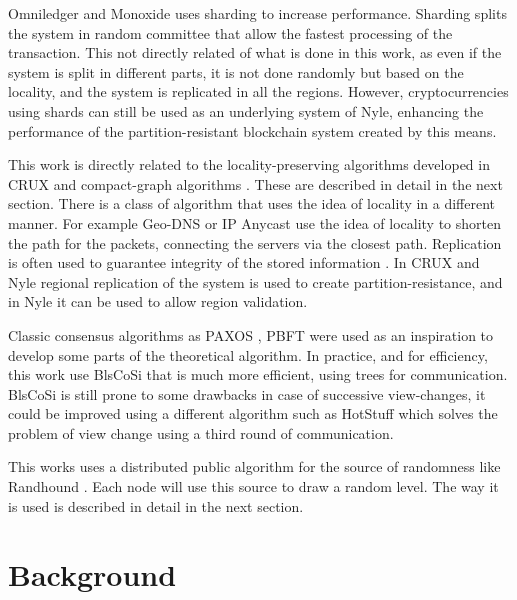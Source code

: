 \documentclass[a4paper,11pt,oneside]{report}
\begin{document}
Omniledger \cite{Kokoris-Kogias2017}  and Monoxide \cite{Wang2019} uses
sharding to increase performance.  Sharding splits the system in random
committee that allow the fastest processing of the transaction. This not
directly related of what is done in this work, as even if the system is split
in different parts, it is not done randomly but based on the locality, and the
system is replicated in all the regions. However, cryptocurrencies using shards
can still be used as an underlying system of Nyle, enhancing the performance of
the partition-resistant blockchain system created by this means.

This work is directly related to the locality-preserving algorithms developed
in CRUX \cite{Basescu2014} and compact-graph algorithms \cite{Thorup2005}. These
are described in detail in the next section. There is a class of algorithm that
uses the idea of locality in a different manner. For example Geo-DNS
\cite{Katz-bassett2006} or IP Anycast \cite{Abley2006} use the idea of locality
to shorten the path for the packets, connecting the servers via the closest
path. Replication is often used to guarantee integrity of the stored
information \cite{find-paper-replication}. In CRUX \cite{Basescu2014} and Nyle
regional replication of the system is used to create partition-resistance, and
in Nyle it can be used to allow region validation.

Classic consensus algorithms as PAXOS \cite{Lamport2000}, PBFT
\cite{Castro1999} were used as an inspiration to develop some parts of the
theoretical algorithm. In practice, and for efficiency, this work use BlsCoSi
\cite{Boneh2018} that is much more efficient, using trees for communication.
BlsCoSi \cite{Boneh2018} is still prone to some drawbacks in case of successive
view-changes, it could be improved using a different algorithm such as HotStuff
\cite{Yin2018} which solves the problem of view change using a third round of
communication. %

This works uses a distributed public algorithm for the source of randomness
like Randhound \cite{Syta2016}. Each node will use this source to draw a random
level.  The way it is used is described in detail in the next section. 


\chapter{Background} \label{chap:Background}

\end{document}
